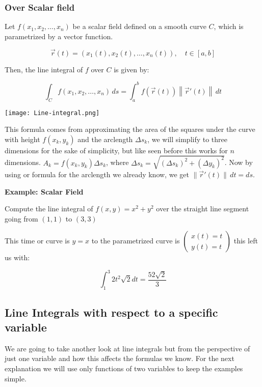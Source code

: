 \subsubsection{Over Scalar field}

Let \( f(x_1, x_2, \ldots, x_n) \) be a scalar field defined on a smooth curve \( C \), which 
is parametrized by a vector function.

\[
    \vec{r}(t) = (x_1(t), x_2(t), \ldots, x_n(t)), \quad t \in [a, b]
\]

Then, the line integral of \( f \) over \( C \) is given by:

\[
    \int_C f(x_1, x_2, \ldots, x_n) \, ds = \int_a^b f(\vec{r}(t)) \left\| \vec{r}'(t) \right\| \, dt
\]


\begin{center}
    \texttt{[image: Line-integral.png]}
\end{center}

This formula comes from approximating the area of the squares under the curve with height \(f(x_k, y_k)\) 
and the arclength \(\varDelta s_k\), we will simplify to three dimensions for the sake
of simplicity, but like seen before this works for \(n\) dimensions. 
\(A_k = f(x_k, y_k) \varDelta s_k\), where 
\(\varDelta s_k = \sqrt{(\varDelta s_k)^2 + (\varDelta y_k)^2} \). Now by using or formula for the arclength
we already know, we get \(\|\vec{r}' (t)\| \, dt = ds\). 

\textbf{Example: Scalar Field}
\vspace{\baselineskip}

Compute the line integral of \(f(x,y) = x^2 + y^2\) over the straight line segment going
from \((1,1)\) to \((3,3)\)

This time or curve is \(y = x\) to the parametrized curve is \(\begin{pmatrix}
    x(t) = t \\ y(t) = t
\end{pmatrix}\) this left us with:

\[
    \int_{1}^{3}  2t^2 \sqrt{2}dt = \frac{52\sqrt{2}}{3} 
\]

\subsection{Line Integrals with respect to a specific variable}

We are going to take another look at line integrals but from the perspective of just one variable and how 
this affects the formulas we know. For the next explanation we will use only functions of two variables to keep the 
examples simple.

